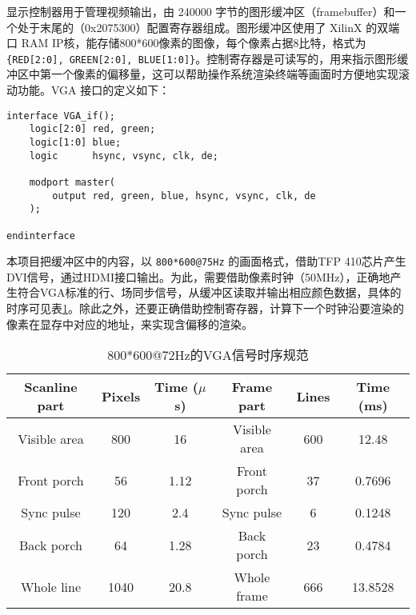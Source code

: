 显示控制器用于管理视频输出，由 240000 字节的图形缓冲区（framebuffer）和一个处于末尾的（0x2075300）配置寄存器组成。图形缓冲区使用了 XilinX 的双端口 RAM IP核，能存储800*600像素的图像，每个像素占据8比特，格式为\texttt{\{RED[2:0], GREEN[2:0], BLUE[1:0]\}}。控制寄存器是可读写的，用来指示图形缓冲区中第一个像素的偏移量，这可以帮助操作系统渲染终端等画面时方便地实现滚动功能。VGA 接口的定义如下：

\begin{verbatim}
interface VGA_if();
    logic[2:0] red, green;
    logic[1:0] blue;
    logic      hsync, vsync, clk, de;

    modport master(
        output red, green, blue, hsync, vsync, clk, de
    );

endinterface
\end{verbatim}

本项目把缓冲区中的内容，以 \texttt{800*600@75Hz} 的画面格式，借助TFP 410芯片产生DVI信号，通过HDMI接口输出。为此，需要借助像素时钟（50MHz），正确地产生符合VGA标准的行、场同步信号，从缓冲区读取并输出相应颜色数据，具体的时序可见表\ref{table:vga_timing}。除此之外，还要正确借助控制寄存器，计算下一个时钟沿要渲染的像素在显存中对应的地址，来实现含偏移的渲染。

\begin{table}[htbp]
    \centering
    \caption{800*600@72Hz的VGA信号时序规范}
    \label{table:vga_timing}
    \begin{tabular}{@{}|c|c|c||c|c|c|@{}}
      \hline
      \textbf{Scanline part}                       & \textbf{Pixels} & \textbf{Time ($\mu$s)} & \textbf{Frame part} & \textbf{Lines} & \textbf{Time (ms)} \\ \hline
      Visible area                                 & 800             & 16                     & Visible area        & 600            & 12.48              \\ 
      Front porch                                  & 56              & 1.12                   & Front porch         & 37             & 0.7696             \\ 
      Sync pulse                                   & 120             & 2.4                    & Sync pulse          & 6              & 0.1248             \\ 
      Back porch                                   & 64              & 1.28                   & Back porch          & 23             & 0.4784             \\ \hline
      Whole line                                   & 1040            & 20.8                   & Whole frame         & 666            & 13.8528            \\ \hline
    \end{tabular}
\end{table}

